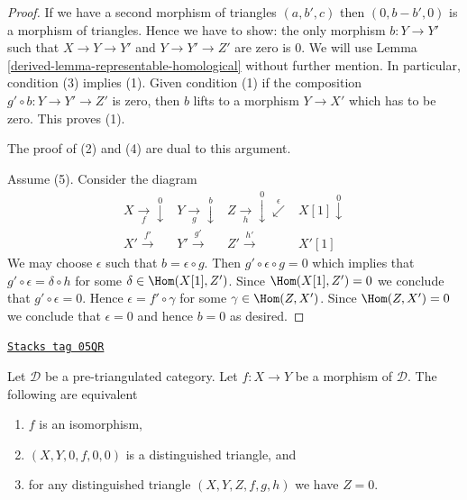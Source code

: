 \begin{proof}

If we have a second morphism of triangles $(a, b', c)$
then $(0, b - b', 0)$ is a morphism of triangles. Hence we
have to show: the only morphism $b : Y \to Y'$ such that
$X \to Y \to Y'$ and $Y \to Y' \to Z'$ are zero is $0$.
We will use Lemma \ref{derived-lemma-representable-homological}
without further mention. In particular, condition (3) implies (1).
Given condition (1) if the composition $g' \circ b : Y \to Y' \to Z'$
is zero, then $b$ lifts to a morphism $Y \to X'$ which has to be zero.
This proves (1).

\medskip\noindent
The proof of (2) and (4) are dual to this argument.

\medskip\noindent
Assume (5). Consider the diagram
$$
\begin{array}{cccc}X \underset{f}{\longrightarrow}\overset{0}{\downarrow} & Y \underset{g}{\longrightarrow}\overset{b}{\downarrow} & Z \underset{h}{\longrightarrow}\overset{0}{\downarrow}\overset{\epsilon}{\swarrow} & X[1] \overset{0}{\downarrow} \\ X' \overset{f'}{\longrightarrow} & Y' \overset{g'}{\longrightarrow} & Z' \overset{h'}{\longrightarrow} & X'[1]\end{array}
$$
We may choose $\epsilon$ such that $b = \epsilon \circ g$.
Then $g' \circ \epsilon \circ g = 0$ which implies that
$g' \circ \epsilon = \delta \circ h$ for some
$\delta \in \Hom(X[1], Z')$. Since $\Hom(X[1], Z') = 0$
we conclude that $g' \circ \epsilon = 0$. Hence
$\epsilon = f' \circ \gamma$ for some $\gamma \in \Hom(Z, X')$.
Since $\Hom(Z, X') = 0$ we conclude that $\epsilon = 0$
and hence $b = 0$ as desired.
\end{proof}

\begin{lemma}
\label{derived-lemma-third-object-zero}
\href{https://stacks.math.columbia.edu/tag/05QR}{\texttt{Stacks tag 05QR}}

Let $\mathcal{D}$ be a pre-triangulated category.
Let $f : X \to Y$ be a morphism of $\mathcal{D}$.
The following are equivalent
\begin{enumerate}
\item $f$ is an isomorphism,
\item $(X, Y, 0, f, 0, 0)$ is a distinguished triangle, and
\item for any distinguished triangle $(X, Y, Z, f, g, h)$ we have $Z = 0$.
\end{enumerate}
\end{lemma}


